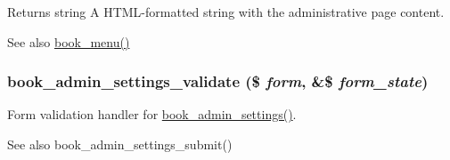 \begin{DoxyReturn}{Returns}
string A HTML-\/formatted string with the administrative page content.
\end{DoxyReturn}
\begin{DoxySeeAlso}{See also}
\hyperlink{book_8module_adc2bbd5235a769fa1ae9b02e8effc15e}{book\_\-menu()} 
\end{DoxySeeAlso}
\hypertarget{book_8admin_8inc_a18c68be0c946b1fdf59bed35fc266d60}{
\subsubsection[{book\_\-admin\_\-settings\_\-validate}]{\setlength{\rightskip}{0pt plus 5cm}book\_\-admin\_\-settings\_\-validate (\$ {\em form}, \/  \&\$ {\em form\_\-state})}}
\label{book_8admin_8inc_a18c68be0c946b1fdf59bed35fc266d60}
Form validation handler for \hyperlink{group__forms_ga036f1d2ed17d79b71545c955c864cf2e}{book\_\-admin\_\-settings()}.

\begin{DoxySeeAlso}{See also}
book\_\-admin\_\-settings\_\-submit() 
\end{DoxySeeAlso}

